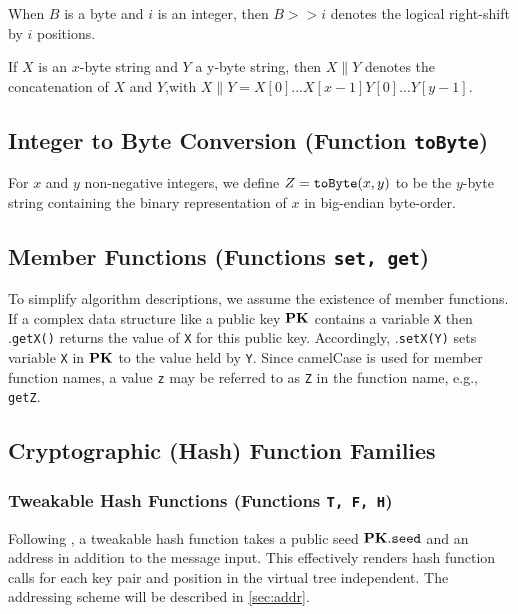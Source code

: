 When $B$ is a byte and $i$ is an integer, then $B >> i$ denotes the logical right-shift by $i$ positions.

If $X$ is an $x$-byte string and $Y$ a y-byte string, then $X \| Y$ denotes the concatenation of $X$ and $Y$,with $X\|Y = X[0]...X[x-1] Y[0]...Y[y-1]$.

\subsection{Integer to Byte Conversion (Function \texttt{toByte})}

For $x$ and $y$ non-negative integers, we define $Z = {\tt toByte}(x,y) $ to be the $y$-byte string containing the binary representation of $x$ in big-endian byte-order.

\subsection{Member Functions (Functions \texttt{set, get})}

To simplify algorithm descriptions, we assume the existence of member functions. If a complex data structure like a public key $\mathbf{PK}$ contains a variable \texttt{X} then \pk.\texttt{getX()} returns the value of \texttt{X} for this public key. Accordingly, \pk.\texttt{setX(Y)} sets variable \texttt{X} in $\mathbf{PK}$ to the value held by \texttt{Y}. Since camelCase is used for member function names, a value \texttt{z} may be referred to as \texttt{Z} in the function name, e.g., \texttt{getZ}.

\subsection{Cryptographic (Hash) Function Families} 

\subsubsection{Tweakable Hash Functions (Functions \texttt{T, F, H})}

Following \SPHINCSP, a tweakable hash function takes a public seed $\mathbf{PK}.\mathtt{seed}$ and an address \ADRS in addition to the message input. This effectively renders hash function calls for each key pair and position in the virtual tree independent. The addressing scheme will be described in \cref{sec:addr}.

